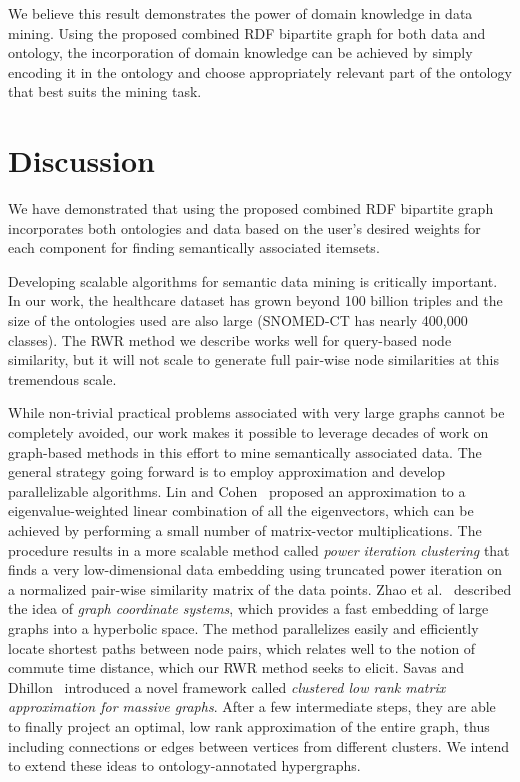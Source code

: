 We believe this result demonstrates the power of domain knowledge in data mining. Using the proposed combined RDF bipartite graph for both data and ontology, the incorporation of domain knowledge can be achieved by simply encoding it in the ontology and choose appropriately relevant part of the ontology that best suits the mining task.

\section{Discussion}
\label{sec:discussion}
We have demonstrated that using the proposed combined RDF bipartite graph incorporates both ontologies and data based on the user's desired weights for each component for finding semantically associated itemsets.

Developing scalable algorithms for semantic data mining is critically important. In our work, the healthcare dataset has grown beyond 100 billion triples and the size of the ontologies used are also large (SNOMED-CT has nearly 400,000 classes). The RWR method we describe works well for query-based node similarity, but it will not scale to generate full pair-wise node similarities at this tremendous scale.%

While non-trivial practical problems associated with very large graphs cannot be completely avoided, our work makes it possible to leverage decades of work on graph-based methods in this effort to mine semantically associated data. The general strategy going forward is to employ approximation and develop parallelizable algorithms. Lin and Cohen~\cite{LinEtal2010ICML} proposed an approximation to a eigenvalue-weighted linear combination of all the eigenvectors, which can be achieved by performing a small number of matrix-vector multiplications.  The procedure results in a more scalable method called \emph{power iteration clustering} that finds a very low-dimensional data embedding using truncated power iteration on a normalized pair-wise similarity matrix of the data points. Zhao et al.~\cite{ZhaoEtal2011Eff} described the idea of \emph{graph coordinate systems}, which provides a fast embedding of large graphs into a hyperbolic space. The method parallelizes easily and efficiently locate shortest paths between node pairs, which relates well to the notion of commute time distance, which our RWR method seeks to elicit. Savas and Dhillon~\cite{SavasEtal2011Clu} introduced a novel framework called \emph{clustered low rank matrix approximation for massive graphs}. After a few intermediate steps, they are able to finally project an optimal, low rank approximation of the entire graph, thus including connections or edges between vertices from different clusters. We intend to extend these ideas to ontology-annotated hypergraphs.

